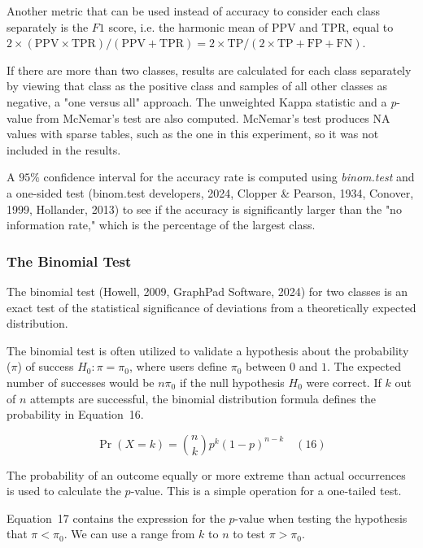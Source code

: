 \documentclass[sn-mathphys-num]{sn-jnl}%
\begin{document}
Another metric that can be used instead of accuracy to consider each class separately is the $F1$ score, i.e. the harmonic mean of PPV and TPR, equal to $2 \times (\mathrm{PPV} \times \mathrm{TPR}) / (\mathrm{PPV} + \mathrm{TPR}) = 2 \times \mathrm{TP} / (2 \times \mathrm{TP} + \mathrm{FP} + \mathrm{FN})$.

If there are more than two classes, results are calculated for each class separately by viewing that class as the positive class and samples of all other classes as negative, a "one versus all" approach.
The unweighted Kappa statistic and a \textit{p}-value from McNemar's test are also computed. McNemar's test produces NA values with sparse tables, such as the one in this experiment, so it was not included in the results.

A $95\%$ confidence interval for the accuracy rate is computed using \textit{binom.test} and a one-sided test (binom.test developers, 2024, Clopper & Pearson, 1934, Conover, 1999, Hollander, 2013) to see if the accuracy is significantly larger than the "no information rate," which is the percentage of the largest class.

\subsubsection{The Binomial Test}

The binomial test (Howell, 2009, GraphPad Software, 2024) for two classes is an exact test of the statistical significance of deviations from a theoretically expected distribution.

The binomial test is often utilized to validate a hypothesis about the probability ($\pi$) of success 
$H_{0}\colon \pi =\pi_{0}$, where users define $\pi_{0}$ between $0$ and $1$. The expected number of successes would be $n\pi_{0}$ if the null hypothesis $H_{0}$ were correct. If $k$ out of $n$ attempts are successful, the binomial distribution formula defines the probability in Equation~16.

\begin{equation}
	\Pr(X=k)={\binom{n}{k}}p^{k}(1-p)^{n-k}
	\quad\left(16\right)
\end{equation}

The probability of an outcome equally or more extreme than actual occurrences is used to calculate the $p$-value. This is a simple operation for a one-tailed test. 

Equation~17 contains the expression for the $p$-value when testing the hypothesis that $\pi <\pi_{0}$. We can use a range from $k$ to $n$ to test $\pi >\pi_{0}$.
\end{document}

